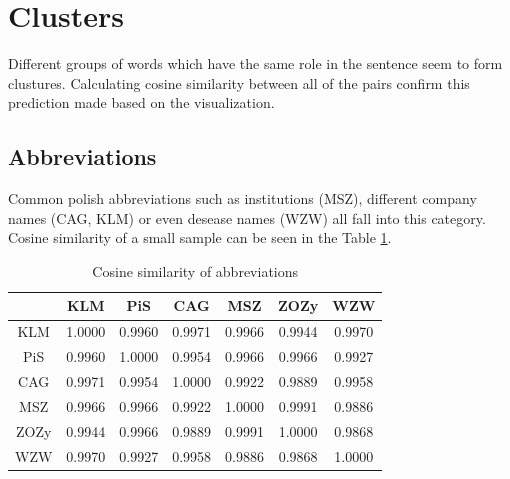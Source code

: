 \documentclass{article}
\begin{document}
  \section{Clusters}

  Different groups of words which have the same role in the sentence seem to
  form clustures. Calculating cosine similarity between all of the pairs confirm
  this prediction made based on the visualization.

  \subsection{Abbreviations}
  Common polish abbreviations such as institutions (MSZ), different company names (CAG, KLM)
  or even desease names (WZW) all fall into this category. Cosine similarity of
  a small sample can be seen in the Table \ref{tab:abbreviations}.
  \begin{table}[ht]
  \center
    \begin{tabular}{|c|c|c|c|c|c|c|}
    \hline
    & KLM & PiS & CAG & MSZ & ZOZy & WZW \\ \hline
    KLM & 1.0000 & 0.9960 & 0.9971 & 0.9966 & 0.9944 & 0.9970 \\ \hline
    PiS & 0.9960 & 1.0000 & 0.9954 & 0.9966 & 0.9966 & 0.9927 \\ \hline
    CAG & 0.9971 & 0.9954 & 1.0000 & 0.9922 & 0.9889 & 0.9958 \\ \hline
    MSZ & 0.9966 & 0.9966 & 0.9922 & 1.0000 & 0.9991 & 0.9886 \\ \hline
    ZOZy & 0.9944 & 0.9966 & 0.9889 & 0.9991 & 1.0000 & 0.9868 \\ \hline
    WZW & 0.9970 & 0.9927 & 0.9958 & 0.9886 & 0.9868 & 1.0000 \\ \hline
    \end{tabular}
  \caption{Cosine similarity of abbreviations}
  \label{tab:abbreviations}
  \end{table}
\end{document}
